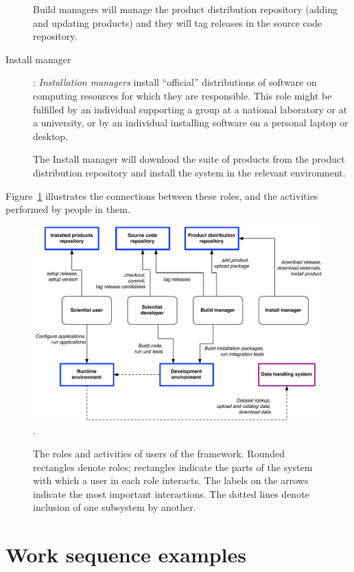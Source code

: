 \documentclass[draftmode,draftwater]{memarticle}
\newcommand{\cosmosis}{\name{CosmoSIS}\xspace}
\begin{document}
\begin{description}
  Build managers will manage the {product distribution repository} (adding and updating products) and they will tag releases in the source code repository.


\item[Install manager]: \emph{Installation managers} install
  ``official'' distributions of software on computing resources for
  which they are responsible. This role might be fulfilled by an
  individual supporting a group at a national laboratory or at a
  university, or by an individual installing software on a personal
laptop or desktop.


  The Install manager will download the suite of products from the product distribution repository and install the system in the relevant environment.


\end{description}

Figure~\ref{fig:roles} illustrates the connections between these roles, and the activities
performed by people in them.
\begin{figure}
  \centering
  \includegraphics[width=\textwidth]{roles}.
  \caption{The roles and activities of users of the \cosmosis
    framework. Rounded rectangles denote roles; rectangles indicate
    the parts of the \cosmosis system with which a user in each role
    interacts. The labels on the arrows indicate the most important
    interactions. The dotted lines denote inclusion of one subsystem
    by another.}
  \label{fig:roles}
\end{figure}

\section{Work sequence examples}
\end{document}
